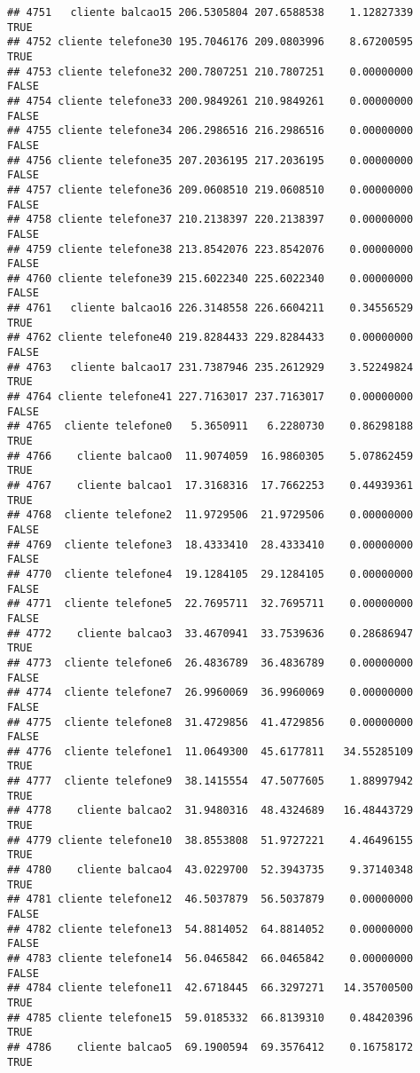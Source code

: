 \documentclass[
]{article}
\begin{document}
\begin{verbatim}
## 4751   cliente balcao15 206.5305804 207.6588538    1.12827339     TRUE
## 4752 cliente telefone30 195.7046176 209.0803996    8.67200595     TRUE
## 4753 cliente telefone32 200.7807251 210.7807251    0.00000000    FALSE
## 4754 cliente telefone33 200.9849261 210.9849261    0.00000000    FALSE
## 4755 cliente telefone34 206.2986516 216.2986516    0.00000000    FALSE
## 4756 cliente telefone35 207.2036195 217.2036195    0.00000000    FALSE
## 4757 cliente telefone36 209.0608510 219.0608510    0.00000000    FALSE
## 4758 cliente telefone37 210.2138397 220.2138397    0.00000000    FALSE
## 4759 cliente telefone38 213.8542076 223.8542076    0.00000000    FALSE
## 4760 cliente telefone39 215.6022340 225.6022340    0.00000000    FALSE
## 4761   cliente balcao16 226.3148558 226.6604211    0.34556529     TRUE
## 4762 cliente telefone40 219.8284433 229.8284433    0.00000000    FALSE
## 4763   cliente balcao17 231.7387946 235.2612929    3.52249824     TRUE
## 4764 cliente telefone41 227.7163017 237.7163017    0.00000000    FALSE
## 4765  cliente telefone0   5.3650911   6.2280730    0.86298188     TRUE
## 4766    cliente balcao0  11.9074059  16.9860305    5.07862459     TRUE
## 4767    cliente balcao1  17.3168316  17.7662253    0.44939361     TRUE
## 4768  cliente telefone2  11.9729506  21.9729506    0.00000000    FALSE
## 4769  cliente telefone3  18.4333410  28.4333410    0.00000000    FALSE
## 4770  cliente telefone4  19.1284105  29.1284105    0.00000000    FALSE
## 4771  cliente telefone5  22.7695711  32.7695711    0.00000000    FALSE
## 4772    cliente balcao3  33.4670941  33.7539636    0.28686947     TRUE
## 4773  cliente telefone6  26.4836789  36.4836789    0.00000000    FALSE
## 4774  cliente telefone7  26.9960069  36.9960069    0.00000000    FALSE
## 4775  cliente telefone8  31.4729856  41.4729856    0.00000000    FALSE
## 4776  cliente telefone1  11.0649300  45.6177811   34.55285109     TRUE
## 4777  cliente telefone9  38.1415554  47.5077605    1.88997942     TRUE
## 4778    cliente balcao2  31.9480316  48.4324689   16.48443729     TRUE
## 4779 cliente telefone10  38.8553808  51.9727221    4.46496155     TRUE
## 4780    cliente balcao4  43.0229700  52.3943735    9.37140348     TRUE
## 4781 cliente telefone12  46.5037879  56.5037879    0.00000000    FALSE
## 4782 cliente telefone13  54.8814052  64.8814052    0.00000000    FALSE
## 4783 cliente telefone14  56.0465842  66.0465842    0.00000000    FALSE
## 4784 cliente telefone11  42.6718445  66.3297271   14.35700500     TRUE
## 4785 cliente telefone15  59.0185332  66.8139310    0.48420396     TRUE
## 4786    cliente balcao5  69.1900594  69.3576412    0.16758172     TRUE

\end{verbatim}
\end{document}
